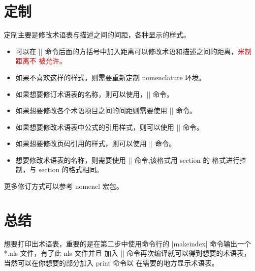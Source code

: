 \documentclass{ctexart}
\newcommand{\txr}[1]{\textcolor{red}{#1}}
\begin{document}
\setlength{\nomitemsep}{0.2cm}
\renewcommand{\nomentryend}{.}
\renewcommand{\eqdeclaration}[1]{见公式:(#1)}
\renewcommand{\pagedeclaration}[1]{见第 (#1) 页}
\renewcommand{\nomname}{术语表}
\section{定制}

定制主要是修改术语表与描述之间的间距，各种显示的样式。
\begin{itemize}
	\item 可以在 |\printnomenclature| 命令后面的方括号中加入距离可以修改术语和描述之间的距离，\txr{米制距离不
		被允许。}
	\item 如果不喜欢这样的样式，则需要重新定制 nomenclature 环境。
	\item 如果想要修订术语表的名称，则可以使用，|\renewcommand{\nomname}{List of Symbols}| 命令。 
	\item 如果想要修改各个术语项目之间的间距则需要使用 |\setlength{\nomitemsep}{space}| 命令。
	\item 如果想要修改术语表中公式的引用样式，则可以使用 |\renewcommand{\eqdeclaration}[1]{style #1}| 命令。
	\item 如果想要修改页码引用的样式，则可以使用 |\renewcommand{\pagedeclaration}[1]{style#1}| 命令。
	\item 想要修改术语表的名称，则需要使用 |\renewcommand{\nomname}{name}| 命令,该格式用 section 的
	格式进行控制，与 section 的格式相同。
\end{itemize} 

\par 更多修订方式可以参考 nomencl 宏包。

\section{总结}
想要打印出术语表，重要的是在第二步中使用命令行的 |makeindex| 命令输出一个*.nls 文件，有了此 nls 文件并且
加入 |\printnomenclature[0.5in]| 命令再次编译就可以得到想要的术语表，当然可以在你想要的部分加入 print 命令以
在需要的地方显示术语表。

\printnomenclature[0.5in]
\end{document}

